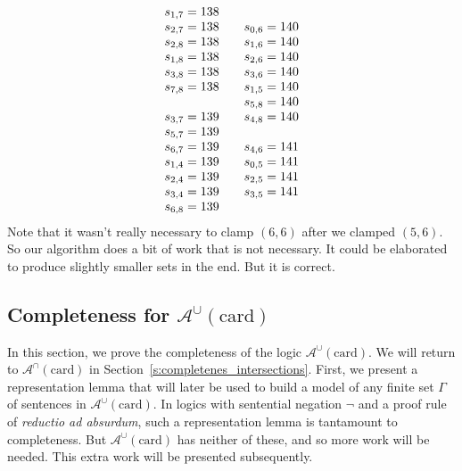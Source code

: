 \documentclass[letterpaper]{article}
\theoremstyle{definition}
\newcommand{\nott}{\neg}
\newcommand{\Aunion}{\mathscr{A}^{\cup}}
\newcommand{\Ainter}{\mathscr{A}^{\cap}}
\newcommand{\card}{\mathrm{card}}
\begin{document}
\[\begin{array}[t]{lllll}
\begin{array}{l}
s_{1, 7} = 138 \\
s_{2, 7} = 138 \\
s_{2, 8} = 138 \\
s_{1, 8} = 138 \\
s_{3, 8} = 138 \\
s_{7, 8} = 138 \\
\\
s_{3, 7} = 139 \\
s_{5, 7} = 139 \\
s_{6, 7} = 139 \\
s_{1, 4} = 139 \\
s_{2, 4} = 139 \\
s_{3, 4} = 139 \\
s_{6, 8} = 139 \\
   \end{array}
 &
  \begin{array}{l}
s_{0, 6} = 140 \\
s_{1, 6} = 140 \\
s_{2, 6} = 140 \\
s_{3, 6} = 140 \\
s_{1, 5} = 140 \\
s_{5, 8} = 140 \\
s_{4, 8} = 140 \\
\\
s_{4, 6} = 141 \\
s_{0, 5} = 141 \\
s_{2, 5} = 141 \\
s_{3, 5} = 141 \\
\end{array}
\end{array}
\]
Note that it wasn't really necessary to clamp $(6,6)$ after we clamped $(5,6)$.
So our algorithm does a bit of work that is not necessary.   
It could be elaborated to produce slightly smaller sets in the end.  But it is correct.


\subsection{Completeness for $\Aunion(\card)$}

In this section, we prove the completeness of the logic $\Aunion(\card)$.  We will return to $\Ainter(\card)$ in Section~\ref{s:completenes_intersections}. First, we present a representation lemma that will later be used to build a model of any finite set $\Gamma$ of sentences in $\Aunion(\card)$.
In logics with sentential negation $\nott$ and a proof rule of \emph{reductio ad absurdum}, such a representation lemma is tantamount to completeness.  But $\Aunion(\card)$ has neither of these, and so more work will be needed.  This extra work will be presented subsequently.
\end{document}

